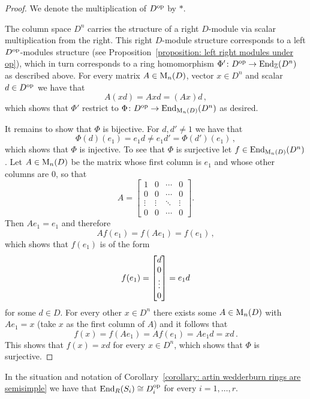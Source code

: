 \begin{proof}
  We denote the multiplication of $D^{\mathrm{op}}$ by $*$.
  
  The column space $D^n$ carries the structure of a right $D$-module via scalar multiplication from the right.
  This right $D$-module structure corresponds to a left $D^{\mathrm{op}}$-modules structure (see Proposition~\ref{proposition: left right modules under op}), which in turn corresponds to a ring homomorphism $\Phi' \colon D^{\mathrm{op}} \to \operatorname{End}_{\mathbb{Z}}(D^n)$ as described above.
  For every matrix $A \in \operatorname{M}_n(D)$, vector $x \in D^n$ and scalar $d \in D^{\mathrm{op}}$ we have that
  \[
      A(xd)
    = Axd
    = (Ax)d \,,
  \]
  which shows that $\Phi'$ restrict to $\Phi \colon D^{\mathrm{op}} \to \operatorname{End}_{\operatorname{M}_n(D)}(D^n)$ as desired.
  
  It remains to show that $\Phi$ is bijective.
  For $d, d' \neq 1$ we have that
  \[
          \Phi(d)(e_1)
    =     e_1 d
    \neq  e_1 d'
    =     \Phi(d')(e_1) \,,
  \]
  which shows that $\Phi$ is injective.
  To see that $\Phi$ is surjective let $f \in \operatorname{End}_{\operatorname{M}_n(D)}(D^n)$.
  Let $A \in \operatorname{M}_n(D)$ be the matrix whose first column is $e_1$ and whose other columns are $0$, so that
  \[
      A
    = \begin{bmatrix}
        1       & 0       & \cdots  & 0       \\
        0       & 0       & \cdots  & 0       \\
        \vdots  & \vdots  & \ddots  & \vdots  \\
        0       & 0       & \cdots  & 0
      \end{bmatrix}.
  \]
  Then $A e_1 = e_1$ and therefore
  \[
      A f(e_1)
    = f(A e_1)
    = f(e_1) \,,
  \]
  which shows that $f(e_1)$ is of the form
  \[
      f(e_1)
    = \begin{bmatrix}d \\ 0 \\ \vdots \\ 0\end{bmatrix}
    = e_1 d
  \]
  for some $d \in D$.
  For every other $x \in D^n$ there exists some $A \in \operatorname{M}_n(D)$ with $Ae_1 = x$ (take $x$ as the first column of $A$) and it follows that
  \[
      f(x)
    = f(A e_1)
    = A f(e_1)
    = A e_1 d
    = x d \,.
  \]
  This shows that $f(x) = xd$ for every $x \in D^n$, which shows that $\Phi$ is surjective.
\end{proof}


\begin{corollary}
  \label{corollary: endomorphism ring of Si}
  In the situation and notation of Corollary~\ref{corollary: artin wedderburn rings are semisimple} we have that $\operatorname{End}_R(S_i) \cong D_i^{\mathrm{op}}$ for every $i = 1, \dotsc, r$.
\end{corollary}


